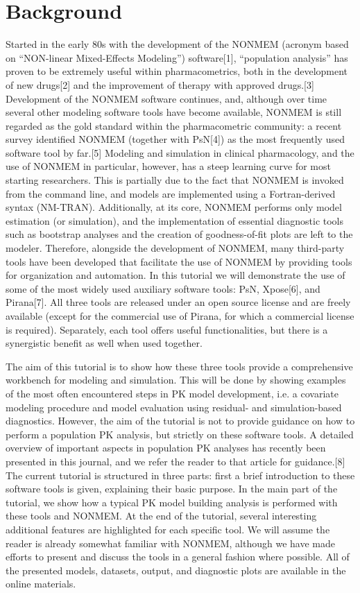 \section{Background}Started in the early 80s with the development
of the NONMEM (acronym based on “NON-linear Mixed-Effects Modeling”)
software[1], “population analysis” has proven to be extremely useful
within pharmacometrics, both in the development of new drugs[2] and
the improvement of therapy with approved drugs.[3] Development of the
NONMEM software continues, and, although over time several other
modeling software tools have become available, NONMEM is still
regarded as the gold standard within the pharmacometric community: a
recent survey identified NONMEM (together with PsN[4]) as the most
frequently used software tool by far.[5] Modeling and simulation in
clinical pharmacology, and the use of NONMEM in particular, however,
has a steep learning curve for most starting researchers. This is
partially due to the fact that NONMEM is invoked from the command
line, and models are implemented using a Fortran-derived syntax
(NM-TRAN). Additionally, at its core, NONMEM performs only model
estimation (or simulation), and the implementation of essential
diagnostic tools such as bootstrap analyses and the creation of
goodness-of-fit plots are left to the modeler. Therefore, alongside
the development of NONMEM, many third-party tools have been developed
that facilitate the use of NONMEM by providing tools for organization
and automation. In this tutorial we will demonstrate the use of some
of the most widely used auxiliary software tools: PsN, Xpose[6], and
Pirana[7]. All three tools are released under an open source license
and are freely available (except for the commercial use of Pirana, for
which a commercial license is required). Separately, each tool offers
useful functionalities, but there is a synergistic benefit as well
when used together. 

The aim of this tutorial is to show how these three tools provide a
comprehensive workbench for modeling and simulation. This will be done
by showing examples of the most often encountered steps in PK model
development, i.e. a covariate modeling procedure and model evaluation
using residual- and simulation-based diagnostics. However, the aim of
the tutorial is not to provide guidance on how to perform a population
PK analysis, but strictly on these software tools. A detailed overview
of important aspects in population PK analyses has recently been
presented in this journal, and we refer the reader to that article for
guidance.[8] The current tutorial is structured in three parts: first
a brief introduction to these software tools is given, explaining
their basic purpose. In the main part of the tutorial, we show how a
typical PK model building analysis is performed with these tools and
NONMEM. At the end of the tutorial, several interesting additional
features are highlighted for each specific tool. We will assume the
reader is already somewhat familiar with NONMEM, although we have made
efforts to present and discuss the tools in a general fashion where
possible. All of the presented models, datasets, output, and
diagnostic plots are available in the online
materials.

